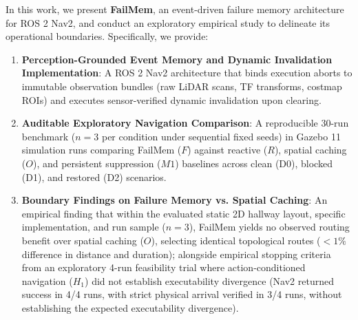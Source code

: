 In this work, we present \textbf{FailMem}, an event-driven failure memory architecture for ROS 2 Nav2, and conduct an exploratory empirical study to delineate its operational boundaries. Specifically, we provide:
\begin{enumerate}
    \item \textbf{Perception-Grounded Event Memory and Dynamic Invalidation Implementation}: A ROS 2 Nav2 architecture that binds execution aborts to immutable observation bundles (raw LiDAR scans, TF transforms, costmap ROIs) and executes sensor-verified dynamic invalidation upon clearing.
    \item \textbf{Auditable Exploratory Navigation Comparison}: A reproducible 30-run benchmark ($n=3$ per condition under sequential fixed seeds) in Gazebo 11 simulation runs comparing FailMem ($F$) against reactive ($R$), spatial caching ($O$), and persistent suppression ($M1$) baselines across clean (D0), blocked (D1), and restored (D2) scenarios.
    \item \textbf{Boundary Findings on Failure Memory vs. Spatial Caching}: An empirical finding that within the evaluated static 2D hallway layout, specific implementation, and run sample ($n=3$), FailMem yields no observed routing benefit over spatial caching ($O$), selecting identical topological routes ($<1\%$ difference in distance and duration); alongside empirical stopping criteria from an exploratory 4-run feasibility trial where action-conditioned navigation ($H_1$) did not establish executability divergence (Nav2 returned success in 4/4 runs, with strict physical arrival verified in 3/4 runs, without establishing the expected executability divergence).
\end{enumerate}
